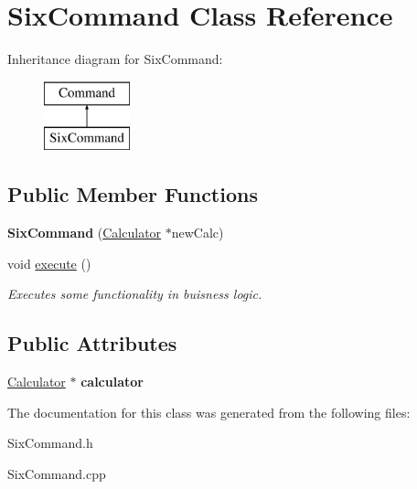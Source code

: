 \hypertarget{class_six_command}{}\section{Six\+Command Class Reference}
\label{class_six_command}
Inheritance diagram for Six\+Command\+:\begin{figure}[H]
\begin{center}
\leavevmode
\includegraphics[height=2.000000cm]{class_six_command}
\end{center}
\end{figure}
\subsection*{Public Member Functions}
\begin{DoxyCompactItemize}
\item 
\hypertarget{class_six_command_aed104b7b3d32d680f6459fc7a124c5a3}{}{\bfseries Six\+Command} (\hyperlink{class_calculator}{Calculator} $\ast$new\+Calc)\label{class_six_command_aed104b7b3d32d680f6459fc7a124c5a3}

\item 
\hypertarget{class_six_command_af34a36bfb4cfd411238144e0afce9d28}{}void \hyperlink{class_six_command_af34a36bfb4cfd411238144e0afce9d28}{execute} ()\label{class_six_command_af34a36bfb4cfd411238144e0afce9d28}

\begin{DoxyCompactList}\small\item\em Executes some functionality in buisness logic. \end{DoxyCompactList}\end{DoxyCompactItemize}
\subsection*{Public Attributes}
\begin{DoxyCompactItemize}
\item 
\hypertarget{class_six_command_aaad9b0fc44a03f98f2de91a140f9a0c2}{}\hyperlink{class_calculator}{Calculator} $\ast$ {\bfseries calculator}\label{class_six_command_aaad9b0fc44a03f98f2de91a140f9a0c2}

\end{DoxyCompactItemize}


The documentation for this class was generated from the following files\+:\begin{DoxyCompactItemize}
\item 
Six\+Command.\+h\item 
Six\+Command.\+cpp\end{DoxyCompactItemize}
